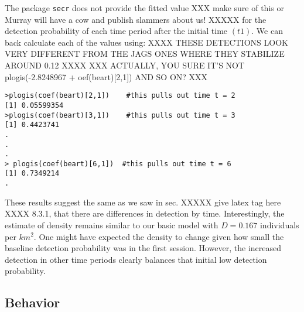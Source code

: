The package \mbox{\tt secr} does not provide the fitted value XXX make
sure of this or Murray will have a cow and publish slammers about us! XXXXX
for the
detection probability of each time period after the initial time
$(t1)$.
 We can back calculate each of the values using:
 XXXX THESE DETECTIONS LOOK VERY DIFFERENT FROM THE JAGS ONES WHERE THEY STABILIZE AROUND 0.12 XXXX
 XXX ACTUALLY, YOU SURE IT'S NOT plogis(-2.8248967 + oef(beart)[2,1]) AND SO ON? XXX
{\small
\begin{verbatim}
>plogis(coef(beart)[2,1])    #this pulls out time t = 2
[1] 0.05599354
>plogis(coef(beart)[3,1])    #this pulls out time t = 3
[1] 0.4423741
.
.
.
> plogis(coef(beart)[6,1])  #this pulls out time t = 6
[1] 0.7349214
.
\end{verbatim}
}
These results suggest the same as we saw in sec. XXXXX give latex tag
here  XXXX 8.3.1, that there
are differences in detection by time.  Interestingly, the estimate of
density remains similar to our basic model with $D = 0.167$
individuals per $km ^2$.
One might have expected the density to change given how
small the baseline detection probability was in the first session.
However, the increased detection in other time periods clearly
balances that initial low detection probability.

\subsection{Behavior}

